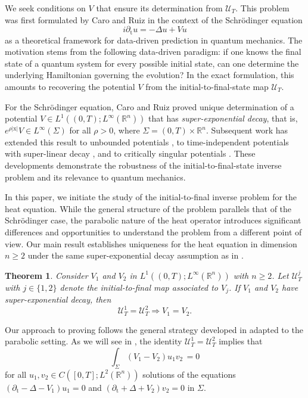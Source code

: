 \documentclass[10pt,a4paper]{amsart}
\newtheorem{main-theorem}{Theorem}
\newcommand{\R}{\mathbb{R}}
\newcommand{\tm}{\mathrm{t}}
\newcommand{\x}{\mathrm{x}}
\begin{document}
We seek conditions on $V$ that ensure its determination from $\mathcal{U}_T$. This problem was 
first formulated by Caro and Ruiz \cite{zbMATH07801151} in the context of the Schrödinger equation
\[ i \partial_\tm u = -\Delta u + V u \]
as a theoretical framework for data-driven prediction in quantum mechanics.
The motivation stems from the following data-driven paradigm: if one knows the final state of a 
quantum system for every possible initial state, can one determine the underlying Hamiltonian 
governing the evolution? In the exact formulation, this amounts to recovering the potential $V$ 
from the initial-to-final-state map $\mathcal{U}_T$.

For the Schrödinger equation, Caro and Ruiz \cite{zbMATH07801151} proved unique
determination of a potential
$V \in L^1((0,T); L^\infty(\R^n))$ that has \emph{super-exponential decay}, that is,
$ e^{\rho |\x|} V \in L^\infty(\Sigma) $ for all $\rho > 0$, where 
$\Sigma = (0, T) \times \R^n$.
Subsequent work has extended this result to unbounded potentials \cite{arXiv:2512.04796}, 
to time-independent potentials with super-linear decay \cite{zbMATH08122191}, and to critically 
singular potentials \cite{arXiv:2602.12122}. These developments demonstrate the robustness of the 
initial-to-final-state inverse problem and its relevance to quantum mechanics.

In this paper, we initiate the study of the initial-to-final inverse problem for the heat equation. 
While the general structure of the problem parallels that of the Schr\"odinger case, the parabolic 
nature of the heat operator introduces significant differences and opportunities to understand
the problem from a different point of view. Our main result establishes uniqueness for the heat 
equation in dimension $n \geq 2$ under the same super-exponential decay assumption as in 
\cite{zbMATH07801151}.

\begin{main-theorem}\label{th:uniqueness} \sl
Consider $V_1$ and $V_2$ in $L^1((0, T); L^\infty (\R^n))$ with $n \geq 2$.
Let $\mathcal{U}_T^j$ with $j \in \{ 1, 2 \}$ denote 
the initial-to-final map associated to $V_j$. If 
$V_1$ and $V_2$ have super-exponential decay, then
\[ \mathcal{U}_T^1 = \mathcal{U}_T^2 \Rightarrow V_1 = V_2. \]
\end{main-theorem}

Our approach to proving  follows the general strategy developed in
\cite{zbMATH07801151} adapted to the parabolic setting.
As we will see in , the identity 
$\mathcal{U}_T^1 = \mathcal{U}_T^2$ implies that
\begin{equation}\label{id:orthogonality}
\int_\Sigma (V_1 - V_2) u_1 v_2 \, = 0
\end{equation}
for all $u_1, v_2 \in C([0,T]; L^2(\R^n))$ solutions of the equations 
$(\partial_\tm - \Delta - V_1) u_1 = 0$ and $(\partial_\tm + \Delta + V_2) v_2 = 0$ in 
$\Sigma$.
\end{document}
